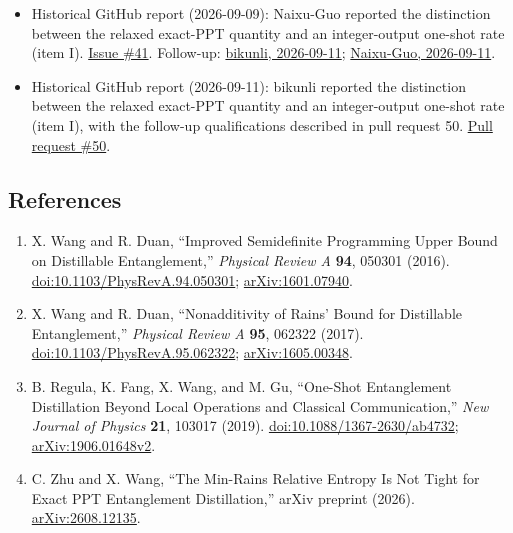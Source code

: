 \begin{itemize}
  \item Historical GitHub report (2026-09-09): Naixu-Guo reported the distinction between the relaxed exact-PPT quantity and an integer-output one-shot rate (item I). \href{https://github.com/Naixu-Guo/quantum-open-problems/issues/41}{Issue \#41}. Follow-up: \href{https://github.com/Naixu-Guo/quantum-open-problems/issues/41#issuecomment-5628256055}{bikunli, 2026-09-11}; \href{https://github.com/Naixu-Guo/quantum-open-problems/issues/41#issuecomment-5628982142}{Naixu-Guo, 2026-09-11}.

  \item Historical GitHub report (2026-09-11): bikunli reported the distinction between the relaxed exact-PPT quantity and an integer-output one-shot rate (item I), with the follow-up qualifications described in pull request 50. \href{https://github.com/Naixu-Guo/quantum-open-problems/pull/50}{Pull request \#50}.
\end{itemize}

\subsection*{References}

\begin{enumerate}[label={},leftmargin=4.8em,labelsep=0.5em]
  \footnotesize
  \item[\textup{[WD16]}]\label{ref:75b9-wang-duan-sdp}
  X. Wang and R. Duan, ``Improved Semidefinite Programming Upper Bound on
  Distillable Entanglement,'' \emph{Physical Review A} \textbf{94}, 050301
  (2016).
  \href{https://doi.org/10.1103/PhysRevA.94.050301}{doi:10.1103/PhysRevA.94.050301};
  \href{https://arxiv.org/abs/1601.07940}{arXiv:1601.07940}.

  \item[\textup{[WD17]}]\label{ref:75b9-wang-duan-nonadditivity}
  X. Wang and R. Duan, ``Nonadditivity of Rains' Bound for Distillable
  Entanglement,'' \emph{Physical Review A} \textbf{95}, 062322 (2017).
  \href{https://doi.org/10.1103/PhysRevA.95.062322}{doi:10.1103/PhysRevA.95.062322};
  \href{https://arxiv.org/abs/1605.00348}{arXiv:1605.00348}.

  \item[\textup{[RFWG19]}]\label{ref:75b9-regula-et-al}
  B. Regula, K. Fang, X. Wang, and M. Gu, ``One-Shot Entanglement
  Distillation Beyond Local Operations and Classical Communication,''
  \emph{New Journal of Physics} \textbf{21}, 103017 (2019).
  \href{https://doi.org/10.1088/1367-2630/ab4732}{doi:10.1088/1367-2630/ab4732};
  \href{https://arxiv.org/abs/1906.01648v2}{arXiv:1906.01648v2}.

  \item[\textup{[ZW26]}]\label{ref:75b9-zhu-wang}
  C. Zhu and X. Wang, ``The Min-Rains Relative Entropy Is Not Tight for
  Exact PPT Entanglement Distillation,'' arXiv preprint (2026).
  \href{https://arxiv.org/abs/2608.12135}{arXiv:2608.12135}.
\end{enumerate}

